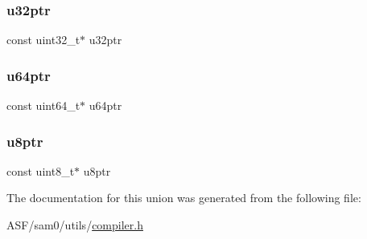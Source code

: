 \subsubsection{\texorpdfstring{u32ptr}{u32ptr}}
{\footnotesize\ttfamily const uint32\+\_\+t$\ast$ u32ptr}

\mbox{\label{union_union_c_ptr_abbc67642e882a52be564515f1c8f12cb}} 
\subsubsection{\texorpdfstring{u64ptr}{u64ptr}}
{\footnotesize\ttfamily const uint64\+\_\+t$\ast$ u64ptr}

\mbox{\label{union_union_c_ptr_acb08e5689c70ca4ef5e0d984f15f47ae}} 
\subsubsection{\texorpdfstring{u8ptr}{u8ptr}}
{\footnotesize\ttfamily const uint8\+\_\+t$\ast$ u8ptr}



The documentation for this union was generated from the following file\+:\begin{DoxyCompactItemize}
\item 
A\+S\+F/sam0/utils/\mbox{\hyperlink{compiler_8h}{compiler.\+h}}\end{DoxyCompactItemize}

